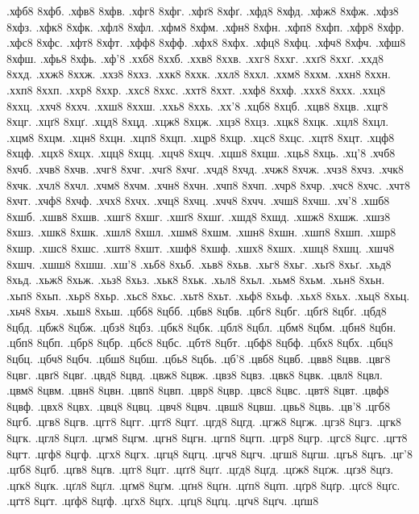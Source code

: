{%
.хфб8
8хфб.
.хфв8
8хфв.
.хфг8
8хфг.
.хфґ8
8хфґ.
.хфд8
8хфд.
.хфж8
8хфж.
.хфз8
8хфз.
.хфк8
8хфк.
.хфл8
8хфл.
.хфм8
8хфм.
.хфн8
8хфн.
.хфп8
8хфп.
.хфр8
8хфр.
.хфс8
8хфс.
.хфт8
8хфт.
.хфф8
8хфф.
.хфх8
8хфх.
.хфц8
8хфц.
.хфч8
8хфч.
.хфш8
8хфш.
.хфь8
8хфь.
.хф'8
.ххб8
8ххб.
.ххв8
8ххв.
.ххг8
8ххг.
.ххґ8
8ххґ.
.ххд8
8ххд.
.ххж8
8ххж.
.ххз8
8ххз.
.ххк8
8ххк.
.ххл8
8ххл.
.ххм8
8ххм.
.ххн8
8ххн.
.ххп8
8ххп.
.ххр8
8ххр.
.ххс8
8ххс.
.ххт8
8ххт.
.ххф8
8ххф.
.ххх8
8ххх.
.ххц8
8ххц.
.ххч8
8ххч.
.ххш8
8ххш.
.ххь8
8ххь.
.хх'8
.хцб8
8хцб.
.хцв8
8хцв.
.хцг8
8хцг.
.хцґ8
8хцґ.
.хцд8
8хцд.
.хцж8
8хцж.
.хцз8
8хцз.
.хцк8
8хцк.
.хцл8
8хцл.
.хцм8
8хцм.
.хцн8
8хцн.
.хцп8
8хцп.
.хцр8
8хцр.
.хцс8
8хцс.
.хцт8
8хцт.
.хцф8
8хцф.
.хцх8
8хцх.
.хцц8
8хцц.
.хцч8
8хцч.
.хцш8
8хцш.
.хць8
8хць.
.хц'8
.хчб8
8хчб.
.хчв8
8хчв.
.хчг8
8хчг.
.хчґ8
8хчґ.
.хчд8
8хчд.
.хчж8
8хчж.
.хчз8
8хчз.
.хчк8
8хчк.
.хчл8
8хчл.
.хчм8
8хчм.
.хчн8
8хчн.
.хчп8
8хчп.
.хчр8
8хчр.
.хчс8
8хчс.
.хчт8
8хчт.
.хчф8
8хчф.
.хчх8
8хчх.
.хчц8
8хчц.
.хчч8
8хчч.
.хчш8
8хчш.
.хч'8
.хшб8
8хшб.
.хшв8
8хшв.
.хшг8
8хшг.
.хшґ8
8хшґ.
.хшд8
8хшд.
.хшж8
8хшж.
.хшз8
8хшз.
.хшк8
8хшк.
.хшл8
8хшл.
.хшм8
8хшм.
.хшн8
8хшн.
.хшп8
8хшп.
.хшр8
8хшр.
.хшс8
8хшс.
.хшт8
8хшт.
.хшф8
8хшф.
.хшх8
8хшх.
.хшц8
8хшц.
.хшч8
8хшч.
.хшш8
8хшш.
.хш'8
.хьб8
8хьб.
.хьв8
8хьв.
.хьг8
8хьг.
.хьґ8
8хьґ.
.хьд8
8хьд.
.хьж8
8хьж.
.хьз8
8хьз.
.хьк8
8хьк.
.хьл8
8хьл.
.хьм8
8хьм.
.хьн8
8хьн.
.хьп8
8хьп.
.хьр8
8хьр.
.хьс8
8хьс.
.хьт8
8хьт.
.хьф8
8хьф.
.хьх8
8хьх.
.хьц8
8хьц.
.хьч8
8хьч.
.хьш8
8хьш.
.цбб8
8цбб.
.цбв8
8цбв.
.цбг8
8цбг.
.цбґ8
8цбґ.
.цбд8
8цбд.
.цбж8
8цбж.
.цбз8
8цбз.
.цбк8
8цбк.
.цбл8
8цбл.
.цбм8
8цбм.
.цбн8
8цбн.
.цбп8
8цбп.
.цбр8
8цбр.
.цбс8
8цбс.
.цбт8
8цбт.
.цбф8
8цбф.
.цбх8
8цбх.
.цбц8
8цбц.
.цбч8
8цбч.
.цбш8
8цбш.
.цбь8
8цбь.
.цб'8
.цвб8
8цвб.
.цвв8
8цвв.
.цвг8
8цвг.
.цвґ8
8цвґ.
.цвд8
8цвд.
.цвж8
8цвж.
.цвз8
8цвз.
.цвк8
8цвк.
.цвл8
8цвл.
.цвм8
8цвм.
.цвн8
8цвн.
.цвп8
8цвп.
.цвр8
8цвр.
.цвс8
8цвс.
.цвт8
8цвт.
.цвф8
8цвф.
.цвх8
8цвх.
.цвц8
8цвц.
.цвч8
8цвч.
.цвш8
8цвш.
.цвь8
8цвь.
.цв'8
.цгб8
8цгб.
.цгв8
8цгв.
.цгг8
8цгг.
.цгґ8
8цгґ.
.цгд8
8цгд.
.цгж8
8цгж.
.цгз8
8цгз.
.цгк8
8цгк.
.цгл8
8цгл.
.цгм8
8цгм.
.цгн8
8цгн.
.цгп8
8цгп.
.цгр8
8цгр.
.цгс8
8цгс.
.цгт8
8цгт.
.цгф8
8цгф.
.цгх8
8цгх.
.цгц8
8цгц.
.цгч8
8цгч.
.цгш8
8цгш.
.цгь8
8цгь.
.цг'8
.цґб8
8цґб.
.цґв8
8цґв.
.цґг8
8цґг.
.цґґ8
8цґґ.
.цґд8
8цґд.
.цґж8
8цґж.
.цґз8
8цґз.
.цґк8
8цґк.
.цґл8
8цґл.
.цґм8
8цґм.
.цґн8
8цґн.
.цґп8
8цґп.
.цґр8
8цґр.
.цґс8
8цґс.
.цґт8
8цґт.
.цґф8
8цґф.
.цґх8
8цґх.
.цґц8
8цґц.
.цґч8
8цґч.
.цґш8
}
